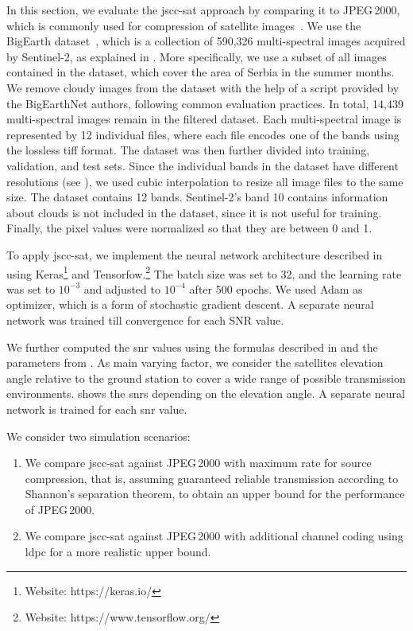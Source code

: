 \documentclass[conference]{IEEEtran}
\newcommand\jpegtwok{JPEG\,2000\xspace}
\newcommand\sentinelii{Sentinel-2\xspace}
\begin{document}
In this section, we evaluate the \ac{jscc-sat} approach by comparing it to \jpegtwok, 
which is commonly used for compression of satellite images~\cite{sentinel-2-user-handbook}.
We use the BigEarth dataset~\cite{sumbul2019bigearthnet,Sumbul2021}, which is a collection of 590,326 multi-spectral images acquired by \sentinelii, as explained in .
More specifically, we use a subset of all images contained in the dataset, which cover the area of Serbia in the summer months.
We remove cloudy images from the dataset with the help of a script provided by the BigEarthNet authors, following common evaluation practices.
In total, 14,439 multi-spectral images remain in the filtered dataset.
Each multi-spectral image is represented by 12 individual files, where each file encodes one of the bands using the lossless \ac{tiff} format.
The dataset was then further divided into training, validation, and test sets.
Since the individual bands in the dataset have different resolutions (see ), we used cubic interpolation to resize all image files to the same size.
The dataset contains 12 bands. \sentinelii's band 10 contains information about clouds is not included in the dataset, since it is not useful for training.
Finally, the pixel values were normalized so that they are between 0 and 1.

To apply \ac{jscc-sat}, we implement the neural network architecture described in  using Keras\footnote{Website: https://keras.io/} and Tensorfow.\footnote{Website: https://www.tensorflow.org/}
The batch size was set to 32, and the learning rate was set to $10^{-3}$ and adjusted to $10^{-4}$ after 500 epochs.
We used Adam as optimizer, which is a form of stochastic gradient descent.
A separate neural network was trained till convergence for each SNR value.

We further computed the \ac{snr} values using the formulas described in  and the parameters from .
As main varying factor, we consider the satellites elevation angle relative to the ground station to cover a wide range of possible transmission environments.
 shows the \acp{snr} depending on the elevation angle.
A separate neural network is trained for each \ac{snr} value.

We consider two simulation scenarios:
%
\begin{enumerate}
  \item We compare \ac{jscc-sat} against \jpegtwok with maximum rate for source compression, that is, assuming guaranteed reliable transmission according to Shannon's separation theorem, to obtain an upper bound for the performance of \jpegtwok.
  \item We compare \ac{jscc-sat} against \jpegtwok with additional channel coding using \ac{ldpc} for a more realistic upper bound.
\end{enumerate}
\end{document}
